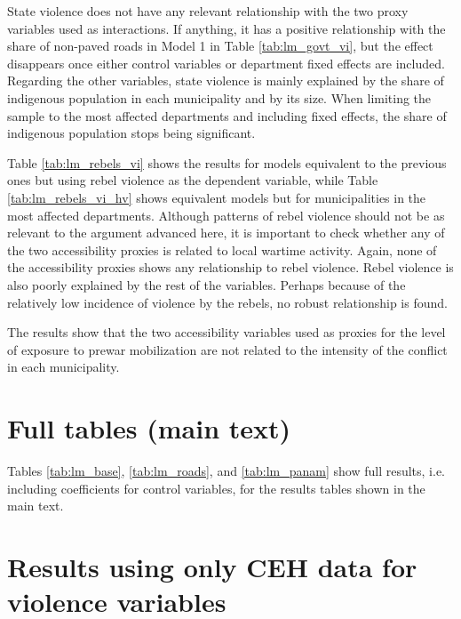 \documentclass[a4paper, 12pt, notitlepage]{article}
\begin{document}
State violence does not have any relevant relationship with the two proxy variables used as interactions.
If anything, it has a positive relationship with the share of non-paved roads in Model 1 in Table \ref{tab:lm_govt_vi}, but the effect disappears once either control variables or department fixed effects are included.
Regarding the other variables, state violence is mainly explained by the share of indigenous population in each municipality and by its size.
When limiting the sample to the most affected departments and including fixed effects, the share of indigenous population stops being significant.

Table \ref{tab:lm_rebels_vi} shows the results for models equivalent to the previous ones but using rebel violence as the dependent variable, while Table \ref{tab:lm_rebels_vi_hv} shows equivalent models but for municipalities in the most affected departments.
Although patterns of rebel violence should not be as relevant to the argument advanced here, it is important to check whether any of the two accessibility proxies is related to local wartime activity.
Again, none of the accessibility proxies shows any relationship to rebel violence.
Rebel violence is also poorly explained by the rest of the variables.
Perhaps because of the relatively low incidence of violence by the rebels, no robust relationship is found.

The results show that the two accessibility variables used as proxies for the level of exposure to prewar mobilization are not related to the intensity of the conflict in each municipality.






\clearpage
\section{Full tables (main text)}\label{app:results_tablong}

Tables \ref{tab:lm_base}, \ref{tab:lm_roads}, and \ref{tab:lm_panam} show full results, i.e. including coefficients for control variables, for the results tables shown in the main text.







\clearpage
\section{Results using only CEH data for violence variables}\label{app:results_ceh}
\end{document}
